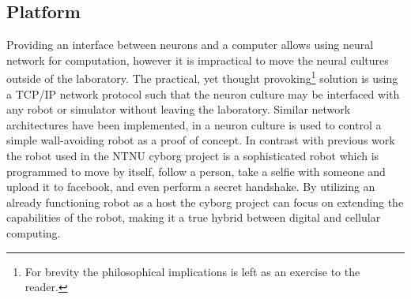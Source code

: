 \subsection{Platform}
Providing an interface between neurons and a computer allows using neural
network for computation, however it is impractical to move the neural cultures
outside of the laboratory.
The practical, yet thought provoking\footnote{For brevity the
  philosophical implications is left as an exercise to the reader.} solution is
using a TCP/IP network protocol such that the neuron culture may be interfaced with any
robot or simulator without leaving the laboratory.
Similar network architectures have been implemented, in
\cite{li_application_2015} a neuron culture is used to control a simple
wall-avoiding robot as a proof of concept.
In contrast with previous work the robot used in the NTNU cyborg project is a
sophisticated robot which is programmed to move by itself, follow a person, take a selfie
with someone and upload it to facebook, and even perform a secret handshake.
By utilizing an already functioning robot as a host the cyborg project can focus
on extending the capabilities of the robot, making it a true hybrid between
digital and cellular computing.
